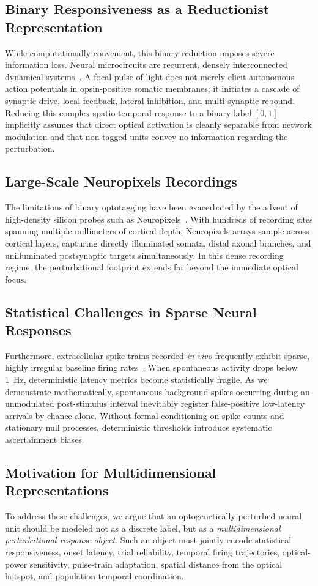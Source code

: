 \documentclass[10pt,journal,compsoc]{IEEEtran}
\begin{document}
\subsection{Binary Responsiveness as a Reductionist Representation}
While computationally convenient, this binary reduction imposes severe information loss. Neural microcircuits are recurrent, densely interconnected dynamical systems~\cite{pfeffer2013inhibition,tremblay2016gabaergic}. A focal pulse of light does not merely elicit autonomous action potentials in opsin-positive somatic membranes; it initiates a cascade of synaptic drive, local feedback, lateral inhibition, and multi-synaptic rebound. Reducing this complex spatio-temporal response to a binary label $[0, 1]$ implicitly assumes that direct optical activation is cleanly separable from network modulation and that non-tagged units convey no information regarding the perturbation.

\subsection{Large-Scale Neuropixels Recordings}
The limitations of binary optotagging have been exacerbated by the advent of high-density silicon probes such as Neuropixels~\cite{jun2017fully,steinmetz2019distributed}. With hundreds of recording sites spanning multiple millimeters of cortical depth, Neuropixels arrays sample across cortical layers, capturing directly illuminated somata, distal axonal branches, and unilluminated postsynaptic targets simultaneously. In this dense recording regime, the perturbational footprint extends far beyond the immediate optical focus.

\subsection{Statistical Challenges in Sparse Neural Responses}
Furthermore, extracellular spike trains recorded \textit{in vivo} frequently exhibit sparse, highly irregular baseline firing rates~\cite{kass2014analysis}. When spontaneous activity drops below 1~Hz, deterministic latency metrics become statistically fragile. As we demonstrate mathematically, spontaneous background spikes occurring during an unmodulated post-stimulus interval inevitably register false-positive low-latency arrivals by chance alone. Without formal conditioning on spike counts and stationary null processes, deterministic thresholds introduce systematic ascertainment biases.

\subsection{Motivation for Multidimensional Representations}
To address these challenges, we argue that an optogenetically perturbed neural unit should be modeled not as a discrete label, but as a \textit{multidimensional perturbational response object}. Such an object must jointly encode statistical responsiveness, onset latency, trial reliability, temporal firing trajectories, optical-power sensitivity, pulse-train adaptation, spatial distance from the optical hotspot, and population temporal coordination.
\end{document}
